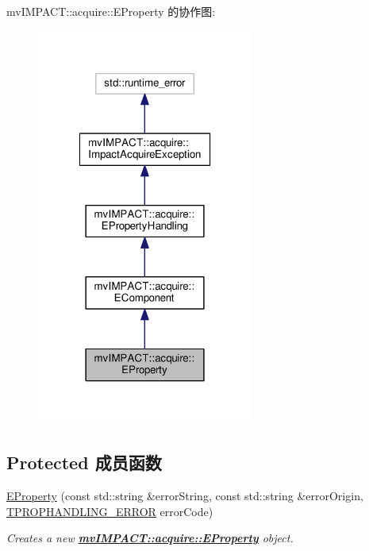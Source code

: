 mv\+I\+M\+P\+A\+C\+T\+:\+:acquire\+:\+:E\+Property 的协作图\+:
\nopagebreak
\begin{figure}[H]
\begin{center}
\leavevmode
\includegraphics[width=202pt]{classmv_i_m_p_a_c_t_1_1acquire_1_1_e_property__coll__graph}
\end{center}
\end{figure}
\subsection*{Protected 成员函数}
\begin{DoxyCompactItemize}
\item 
\hyperlink{classmv_i_m_p_a_c_t_1_1acquire_1_1_e_property_ad20355e39b184288e569d370113ceae6}{E\+Property} (const std\+::string \&error\+String, const std\+::string \&error\+Origin, \hyperlink{group___common_interface_ga61b0634ab285d9a2a303e0092167127e}{T\+P\+R\+O\+P\+H\+A\+N\+D\+L\+I\+N\+G\+\_\+\+E\+R\+R\+O\+R} error\+Code)
\begin{DoxyCompactList}\small\item\em Creates a new {\bfseries \hyperlink{classmv_i_m_p_a_c_t_1_1acquire_1_1_e_property}{mv\+I\+M\+P\+A\+C\+T\+::acquire\+::\+E\+Property}} object. \end{DoxyCompactList}\end{DoxyCompactItemize}
